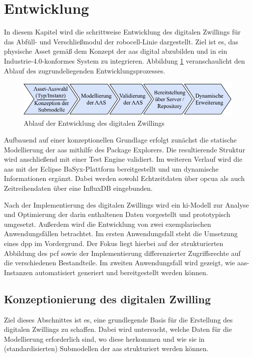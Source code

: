 \newpage
\section{Entwicklung}
In diesem Kapitel wird die schrittweise Entwicklung des digitalen Zwillings für das Abfüll- und Verschließmodul der robocell-Linie dargestellt.
Ziel ist es, das physische Asset gemäß dem Konzept der \acs{aas} digital abzubilden und in ein Industrie-4.0-konformes System zu integrieren.
Abbildung \ref{fig:Entwicklungsschritte} veranschaulicht den Ablauf des zugrundeliegenden Entwicklungsprozesses.

\begin{figure}[htbp]
    \centering
    \includegraphics[width=1\textwidth]{Bilder/vorgehenEntwicklungsteil.pdf}
    \caption{Ablauf der Entwicklung des digitalen Zwillings}
    \label{fig:Entwicklungsschritte}
\end{figure}
\vspace{-1em}

Aufbauend auf einer konzeptionellen Grundlage erfolgt zunächst die statische Modellierung der \acs{aas} mithilfe des Package Explorers. 
Die resultierende Struktur wird anschließend mit einer Test Engine validiert.
Im weiteren Verlauf wird die \acs{aas} mit der Eclipse BaSyx-Plattform bereitgestellt und um dynamische Informationen ergänzt. 
Dabei werden sowohl Echtzeitdaten über \acs{opcua} als auch Zeitreihendaten über eine InfluxDB eingebunden.

Nach der Implementierung des digitalen Zwillings wird ein \acs{ki}-Modell zur Analyse und Optimierung der darin enthaltenen Daten vorgestellt und prototypisch umgesetzt.
Außerdem wird die Entwicklung von zwei exemplarischen Anwendungsfällen betrachtet.
Im ersten Anwendungsfall steht die Umsetzung eines \acs{dpp} im Vordergrund. 
Der Fokus liegt hierbei auf der strukturierten Abbildung des \acs{pcf} sowie der Implementierung differenzierter Zugriffsrechte auf die verschiedenen Bestandteile.
Im zweiten Anwendungsfall wird gezeigt, wie \acs{aas}-Instanzen automatisiert generiert und bereitgestellt werden können.

\subsection{Konzeptionierung des digitalen Zwilling}
Ziel dieses Abschnittes ist es, eine grundlegende Basis für die Erstellung des digitalen Zwillings zu schaffen.
Dabei wird untersucht, welche Daten für die Modellierung erforderlich sind, wo diese herkommen und wie sie in (standardisierten) Submodellen der \acs{aas} strukturiert werden können.
